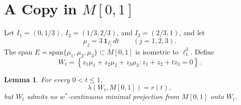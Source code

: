 \documentclass[11pt]{article}
\newtheorem{lemma}{Lemma}
\newcommand{\spanop}{\mathrm{span}}
\newcommand{\wstar}{w^*}
\begin{document}
\section*{A Copy in \(M[0,1]\)}

Let \(I_1=(0,1/3)\), \(I_2=(1/3,2/3)\), and \(I_3=(2/3,1)\), and let
\[
  \mu_j=3\,\mathbf 1_{I_j}\,dt\qquad (j=1,2,3).
\]
The span \(E=\spanop\{\mu_1,\mu_2,\mu_3\}\subset M[0,1]\) is isometric to
\(\ell_1^3\).  Define
\[
  W_t=
  \left\{
    z_1\mu_1+z_2\mu_2+z_3\mu_3:
    z_1+z_2+t z_3=0
  \right\}.
\]

\begin{lemma}
\label{lem:measure}
For every \(0<t\leq 1\),
\[
  \lambda(W_t,M[0,1])=r(t),
\]
but \(W_t\) admits no \(\wstar\)-continuous minimal projection from \(M[0,1]\)
onto \(W_t\).
\end{lemma}
\end{document}
